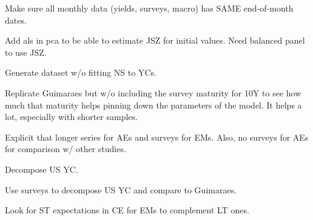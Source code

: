 \documentclass[12pt]{article}
\newcommand{\cmark}{\ding{51}}
\newcommand{\xmark}{\ding{55}}
\newcommand{\done}{\rlap{$\square$}{\raisebox{2pt}{\large\hspace{1pt}\cmark}}%
	\hspace{-2.5pt}}
\newcommand{\wontdo}{\rlap{$\square$}{\large\hspace{1pt}\xmark}}
\begin{document}
\begin{todolist}
	\item[\done] Make sure all monthly data (yields, surveys, macro) has SAME end-of-month dates.
	\item[\wontdo] Add als in pca to be able to estimate JSZ for initial values. Need balanced panel to use JSZ.
	\item[\done] Generate dataset w/o fitting NS to YCs.
	\item[\done] Replicate Guimaraes but w/o including the survey maturity for 10Y to see how much that maturity helps pinning down the parameters of the model. It helps a lot, especially with shorter samples.
	\item[\done] Explicit that longer series for AEs and surveys for EMs. Also, no surveys for AEs for comparison w/ other studies. %
	\item[\done] Decompose US YC.
	\item[\done] Use surveys to decompose US YC and compare to Guimaraes.
	\item[\done] Look for ST expectations in CE for EMs to complement LT ones.
\end{todolist}
\end{document}

